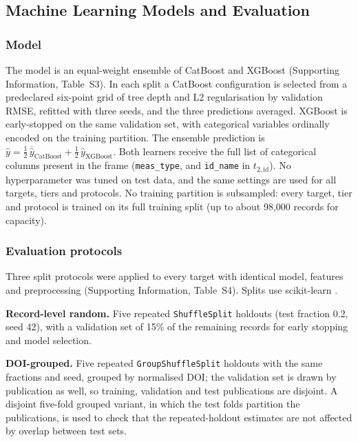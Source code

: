 \documentclass[journal=jcisd8,manuscript=article,layout=traditional]{achemso}
\begin{document}
\subsection{Machine Learning Models and Evaluation}

\subsubsection{Model}
\label{sec:models}

The model is an equal-weight ensemble of CatBoost \cite{prokhorenkova2018catboost} and XGBoost \cite{chen2016xgboost} (Supporting Information, Table~S3). In each split a CatBoost configuration is selected from a predeclared six-point grid of tree depth and L2 regularisation by validation RMSE, refitted with three seeds, and the three predictions averaged. XGBoost is early-stopped on the same validation set, with categorical variables ordinally encoded on the training partition. The ensemble prediction is $\hat y = \tfrac12\,\overline{\hat y}_{\mathrm{CatBoost}} + \tfrac12\,\hat y_{\mathrm{XGBoost}}$. Both learners receive the full list of categorical columns present in the frame (\texttt{meas\_type}, and \texttt{id\_name} in $t_{2,\mathrm{id}}$). No hyperparameter was tuned on test data, and the same settings are used for all targets, tiers and protocols. No training partition is subsampled: every target, tier and protocol is trained on its full training split (up to about 98,000 records for capacity).



\subsubsection{Evaluation protocols}
\label{sec:protocols}

Three split protocols were applied to every target with identical model, features and preprocessing (Supporting Information, Table~S4). Splits use scikit-learn \cite{pedregosa2011sklearn}.

\textbf{Record-level random.} Five repeated \texttt{ShuffleSplit} holdouts (test fraction 0.2, seed 42), with a validation set of 15\% of the remaining records for early stopping and model selection.

\textbf{DOI-grouped.} Five repeated \texttt{GroupShuffleSplit} holdouts with the same fractions and seed, grouped by normalised DOI; the validation set is drawn by publication as well, so training, validation and test publications are disjoint. A disjoint five-fold grouped variant, in which the test folds partition the publications, is used to check that the repeated-holdout estimates are not affected by overlap between test sets.
\end{document}
